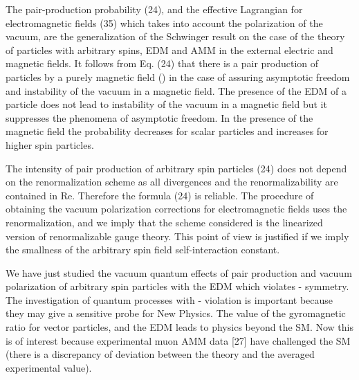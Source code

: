 \documentclass[a4paper,12pt]{article}
\begin{document}
The pair-production probability (24), and the effective Lagrangian for
electromagnetic fields (35) which takes into account the polarization of the
vacuum, are the generalization of the Schwinger result on the case of the
theory of particles with arbitrary spins, EDM and AMM in the external
electric and magnetic fields. It follows from Eq. (24) that there is a pair
production of particles by a purely magnetic field (\coordHE{}) in the case of
\coordHE{} assuring asymptotic freedom and instability of the vacuum in a
magnetic field. The presence of the EDM of a particle does not lead to
instability of the vacuum in a magnetic field but it suppresses the
phenomena of asymptotic freedom. In the presence of the magnetic field the
probability decreases for scalar particles and increases for higher spin
particles.

The intensity of pair production of arbitrary spin particles (24) does not
depend on the renormalization scheme as all divergences and the
renormalizability are contained in Re\coordHE{}. Therefore the formula
(24) is reliable. The procedure of obtaining the vacuum polarization
corrections for electromagnetic fields uses the renormalization, and we
imply that the scheme considered is the linearized version of renormalizable
gauge theory. This point of view is justified if we imply the smallness of
the arbitrary spin field self-interaction constant.

We have just studied the vacuum quantum effects of pair production and
vacuum polarization of arbitrary spin particles with the EDM which violates
\coordHE{} - symmetry. The investigation of quantum processes with \coordHE{} - violation
is important because they may give a sensitive probe for New Physics. The
value of the gyromagnetic ratio \coordHE{} for vector particles, and the EDM
\coordHE{} leads to physics beyond the SM. Now this is of interest because
experimental muon AMM data [27] have challenged the SM (there is a
discrepancy of \myHighlight{$2.6\sigma $}\coordHE{} deviation between the theory and the averaged
experimental value).
\end{document}
